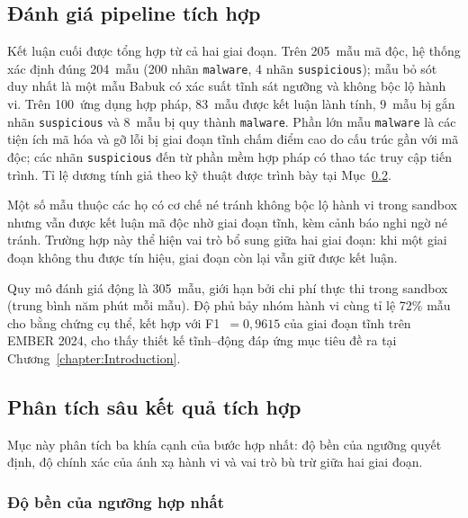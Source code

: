 \documentclass[../DoAn.tex]{subfiles}
\begin{document}
\subsection{Đánh giá pipeline tích hợp}
\label{section:5.3.3}

Kết luận cuối được tổng hợp từ cả hai giai đoạn. Trên 205~mẫu mã độc,
hệ thống xác định đúng 204~mẫu (200 nhãn \texttt{malware}, 4 nhãn
\texttt{suspicious}); mẫu bỏ sót duy nhất là một mẫu Babuk có xác suất
tĩnh sát ngưỡng và không bộc lộ hành vi. Trên 100~ứng dụng hợp pháp,
83~mẫu được kết luận lành tính, 9~mẫu bị gắn nhãn \texttt{suspicious} và
8~mẫu bị quy thành \texttt{malware}. Phần lớn mẫu \texttt{malware} là các
tiện ích mã hóa và gỡ lỗi bị giai đoạn tĩnh chấm điểm cao do cấu trúc gần
với mã độc; các nhãn \texttt{suspicious} đến từ phần mềm hợp pháp có thao
tác truy cập tiến trình. Tỉ lệ dương tính giả theo kỹ thuật được trình bày
tại Mục~\ref{section:5.3.4}.

Một số mẫu thuộc các họ có cơ chế né tránh không bộc lộ hành vi trong
sandbox nhưng vẫn được kết luận mã độc nhờ giai đoạn tĩnh, kèm cảnh báo
nghi ngờ né tránh. Trường hợp này thể hiện vai trò bổ sung giữa hai
giai đoạn: khi một giai đoạn không thu được tín hiệu, giai đoạn còn lại
vẫn giữ được kết luận.

Quy mô đánh giá động là 305~mẫu, giới hạn bởi chi phí thực thi trong
sandbox (trung bình năm phút mỗi mẫu). Độ phủ bảy nhóm hành vi cùng tỉ
lệ 72\% mẫu cho bằng chứng cụ thể, kết hợp với F1~$= 0{,}9615$ của giai
đoạn tĩnh trên EMBER 2024, cho thấy thiết kế tĩnh--động đáp ứng mục
tiêu đề ra tại Chương~\ref{chapter:Introduction}.

\subsection{Phân tích sâu kết quả tích hợp}
\label{section:5.3.4}

Mục này phân tích ba khía cạnh của bước hợp nhất: độ bền của ngưỡng quyết
định, độ chính xác của ánh xạ hành vi và vai trò bù trừ giữa hai giai đoạn.

\subsubsection*{Độ bền của ngưỡng hợp nhất}
\end{document}

